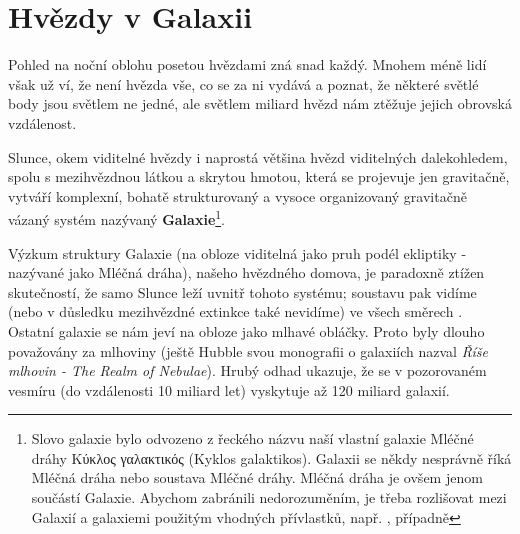 \setchaptertoc
\chapter{Hvězdy v Galaxii}\label{kulIchII}
  Pohled na noční oblohu posetou hvězdami zná snad každý. Mnohem méně lidí však už ví, že není
  hvězda vše, co se za ni vydává a poznat, že některé světlé body jsou světlem ne jedné, ale světlem
  miliard hvězd nám ztěžuje jejich obrovská vzdálenost.

  Slunce, okem viditelné hvězdy i naprostá většina hvězd viditelných dalekohledem, spolu s
  mezihvězdnou látkou a skrytou hmotou, která se projevuje jen gravitačně, vytváří komplexní, bohatě
  strukturovaný a vysoce organizovaný gravitačně vázaný systém nazývaný
  \textbf{Galaxie}\footnote{Slovo galaxie bylo odvozeno z řeckého názvu naší vlastní galaxie Mléčné
  dráhy Κύκλος γαλακτικός (Κyklos galaktikos). Galaxii se
  někdy nesprávně říká Mléčná dráha nebo soustava Mléčné dráhy. Mléčná dráha je ovšem jenom součástí
  Galaxie. Abychom zabránili nedorozuměním, je třeba rozlišovat mezi Galaxií a galaxiemi použitým
  vhodných přívlastků, např. ,  případně }. 

  Výzkum struktury Galaxie (na obloze viditelná jako pruh podél ekliptiky - nazývané jako Mléčná
  dráha), našeho hvězdného domova, je paradoxně ztížen skutečností, že samo Slunce leží uvnitř
  tohoto systému; soustavu pak vidíme (nebo v důsledku mezihvězdné extinkce také nevidíme) ve všech
  směrech \cite[s.~268]{Mikulasek2000}. Ostatní galaxie se nám jeví na obloze jako mlhavé obláčky.
  Proto byly dlouho považovány za mlhoviny (ještě Hubble svou monografii o galaxiích nazval
  \emph{Říše mlhovin - The Realm of Nebulae}). Hrubý odhad ukazuje, že se v pozorovaném vesmíru (do
  vzdálenosti 10 miliard let) vyskytuje až 120 miliard galaxií.

